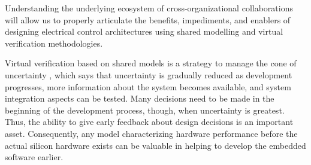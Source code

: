 Understanding the underlying ecosystem of cross-organizational collaborations will allow us to properly articulate the benefits, impediments, and enablers of designing electrical control architectures using shared modelling and virtual verification methodologies.

Virtual verification based on shared models is a strategy to manage the cone of uncertainty \cite{Boehm1981}, 
which says that uncertainty is gradually reduced as development progresses,
more information about the system becomes available,
and system integration aspects can be tested.
Many decisions need to be made in the beginning of the development process, though, when uncertainty is greatest.
Thus, the ability to give early feedback about design decisions is an important asset.
Consequently, any model characterizing hardware performance before the actual silicon hardware exists can be valuable in helping to develop the embedded software earlier.


